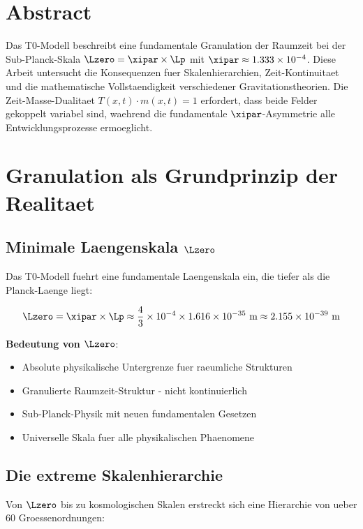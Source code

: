 \section*{Abstract}
		Das T0-Modell beschreibt eine fundamentale Granulation der Raumzeit bei der Sub-Planck-Skala $\Lzero = \xipar \times \Lp$ mit $\xipar \approx 1.333 \times 10^{-4}$. Diese Arbeit untersucht die Konsequenzen fuer Skalenhierarchien, Zeit-Kontinuitaet und die mathematische Vollstaendigkeit verschiedener Gravitationstheorien. Die Zeit-Masse-Dualitaet $T(x,t) \cdot m(x,t) = 1$ erfordert, dass beide Felder gekoppelt variabel sind, waehrend die fundamentale $\xipar$-Asymmetrie alle Entwicklungsprozesse ermoeglicht.

	
	
	\section{Granulation als Grundprinzip der Realitaet}
	
	\subsection{Minimale Laengenskala $\Lzero$}
	
	Das T0-Modell fuehrt eine fundamentale Laengenskala ein, die tiefer als die Planck-Laenge liegt:
	
	\begin{equation}
		\Lzero = \xipar \times \Lp \approx \frac{4}{3} \times 10^{-4} \times 1.616 \times 10^{-35} \text{ m} \approx 2.155 \times 10^{-39} \text{ m}
	\end{equation}
	
	\textbf{Bedeutung von $\Lzero$}:
	\begin{itemize}
		\item Absolute physikalische Untergrenze fuer raeumliche Strukturen
		\item Granulierte Raumzeit-Struktur - nicht kontinuierlich
		\item Sub-Planck-Physik mit neuen fundamentalen Gesetzen
		\item Universelle Skala fuer alle physikalischen Phaenomene
	\end{itemize}
	
	\subsection{Die extreme Skalenhierarchie}
	
	Von $\Lzero$ bis zu kosmologischen Skalen erstreckt sich eine Hierarchie von ueber 60 Groessenordnungen:
	
